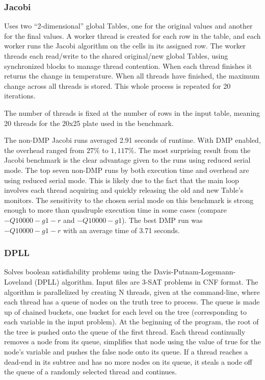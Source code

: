 
\subsubsection{Jacobi}

Uses two ``2-dimensional'' global Tables, one for the original values
and another for the final values.  A worker thread is created for each
row in the table, and each worker runs the Jacobi algorithm on the
cells in its assigned row.  The worker threads each read/write to the
shared original/new global Tables, using synchronized blocks to manage
thread contention.  When each thread finishes it returns the change in
temperature.  When all threads have finished, the maximum change
across all threads is stored.  This whole process is repeated for 20
iterations.

The number of threads is fixed at the number of rows in the input
table, meaning 20 threads for the 20x25 plate used in the benchmark.

The non-DMP Jacobi runs averaged 2.91 seconds of runtime.  With DMP
enabled, the overhead ranged from $27\%$ to $1,117\%$.  The most
surprising result from the Jacobi benchmark is the clear advantage
given to the runs using reduced serial mode.  The top seven non-DMP
runs by both execution time and overhead are using reduced serial
mode.  This is likely due to the fact that the main loop involves each
thread acquiring and quickly releasing the old and new Table's
monitors.  The sensitivity to the chosen serial mode on this benchmark
is strong enough to more than quadruple execution time in some cases
(compare $-Q10000 -g1 -r$ and $-Q10000 -g1$).  The best DMP run was
$-Q10000 -g1 -r$ with an average time of 3.71 seconds.

\subsubsection{DPLL}

Solves boolean satisfiability problems using the
Davis-Putnam-Logemann-Loveland (DPLL) algorithm.  Input files are
3-SAT problems in CNF format.  The algorithm is parallelized by
creating N threads, given at the command-line, where each thread has a
queue of nodes on the truth tree to process.  The queue is made up of
chained buckets, one bucket for each level on the tree (corresponding
to each variable in the input problem).  At the beginning of the
program, the root of the tree is pushed onto the queue of the first
thread.  Each thread continually removes a node from its queue,
simplifies that node using the value of true for the node's variable
and pushes the false node onto its queue.  If a thread reaches a
dead-end in its subtree and has no more nodes on its queue, it steals
a node off the queue of a randomly selected thread and continues.

